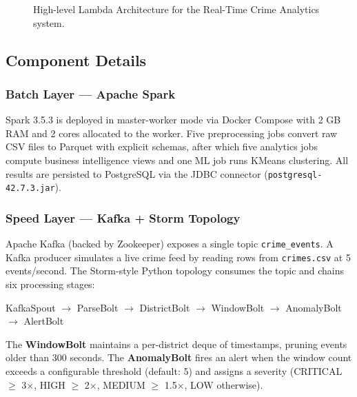 \documentclass[11pt,a4paper]{article}
\begin{document}
\begin{figure}[H]
\caption{High-level Lambda Architecture for the Real-Time Crime Analytics system.}
\label{fig:arch}
\end{figure}

\subsection{Component Details}

\subsubsection{Batch Layer — Apache Spark}
Spark 3.5.3 is deployed in master-worker mode via Docker Compose with
2 GB RAM and 2 cores allocated to the worker. Five preprocessing jobs
convert raw CSV files to Parquet with explicit schemas, after which
five analytics jobs compute business intelligence views and one ML job
runs KMeans clustering. All results are persisted to PostgreSQL via the
JDBC connector (\texttt{postgresql-42.7.3.jar}).

\subsubsection{Speed Layer — Kafka + Storm Topology}
Apache Kafka (backed by Zookeeper) exposes a single topic
\texttt{crime\_events}. A Kafka producer simulates a live crime feed by
reading rows from \texttt{crimes.csv} at 5 events/second. The Storm-style
Python topology consumes the topic and chains six processing stages:

\begin{center}
\ttfamily\small
KafkaSpout $\to$ ParseBolt $\to$ DistrictBolt $\to$ WindowBolt $\to$ AnomalyBolt $\to$ AlertBolt
\end{center}

The \textbf{WindowBolt} maintains a per-district deque of timestamps,
pruning events older than 300 seconds. The \textbf{AnomalyBolt} fires an
alert when the window count exceeds a configurable threshold (default: 5)
and assigns a severity (CRITICAL $\geq$ 3$\times$, HIGH $\geq$ 2$\times$,
MEDIUM $\geq$ 1.5$\times$, LOW otherwise).
\end{document}
